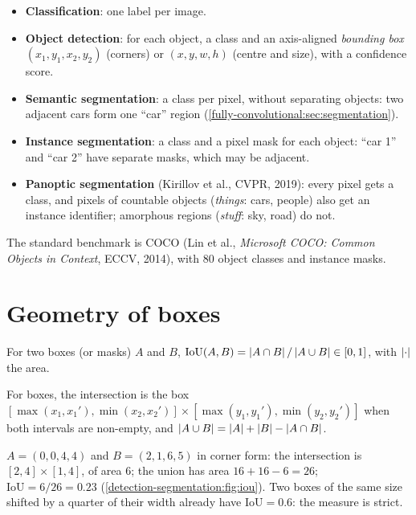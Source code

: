 \begin{notechapter}
\begin{itemize}
  \item \textbf{Classification}: one label per image.
  \item \textbf{Object detection}: for each object, a class and an axis-aligned \emph{bounding box}
        $(x_1, y_1, x_2, y_2)$ (corners) or $(x, y, w, h)$ (centre and size), with a confidence score.
  \item \textbf{Semantic segmentation}: a class per pixel, without separating objects: two adjacent
        cars form one ``car'' region (\cref{fully-convolutional:sec:segmentation}).
  \item \textbf{Instance segmentation}: a class and a pixel mask for each object: ``car 1'' and ``car 2'' have
        separate masks, which may be adjacent.
  \item \textbf{Panoptic segmentation} (Kirillov et al., CVPR, 2019): every pixel gets a class, and pixels of
        countable objects (\emph{things}: cars, people) also get an instance identifier; amorphous
        regions (\emph{stuff}: sky, road) do not.
\end{itemize}
The standard benchmark is COCO (Lin et al., \emph{Microsoft COCO: Common Objects in
Context}, ECCV, 2014), with $80$ object classes and instance masks.

\section{Geometry of boxes}\label{detection-segmentation:sec:boxes}

\begin{definition}\label{detection-segmentation:def:iou}
For two boxes (or masks) $A$ and $B$, $\mathrm{IoU}(A,B) = \left|A\cap B\right|/\left|A\cup B\right|\in[0,1]$, with $\left|\cdot\right|$ the area.
\end{definition}

For boxes, the intersection is the box $[\max(x_1, x_1'), \min(x_2, x_2')]\times[\max(y_1, y_1'), \min(y_2, y_2')]$ when both
intervals are non-empty, and $\left|A\cup B\right| = \left|A\right| + \left|B\right| - \left|A\cap B\right|$.

\begin{example}[IoU]\label{detection-segmentation:ex:iou}
$A = (0,0,4,4)$ and $B = (2,1,6,5)$ in corner form: the intersection is $[2,4]\times[1,4]$, of area $6$; the
union has area $16 + 16 - 6 = 26$; $\mathrm{IoU} = 6/26 = 0.23$ (\cref{detection-segmentation:fig:iou}). Two boxes of the
same size shifted by a quarter of their width already have $\mathrm{IoU} = 0.6$: the measure is strict.
\end{example}


\end{notechapter}
